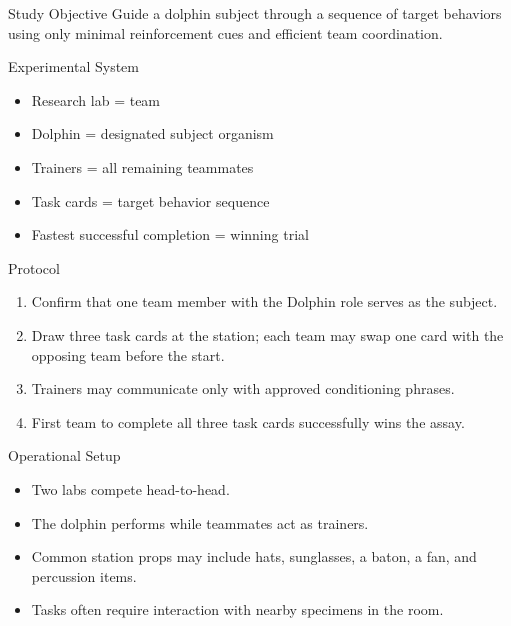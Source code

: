 \documentclass[10pt]{article}
\begin{document}
\begin{minipage}[t]{0.485\textwidth}
\vspace{0pt}
\begin{labbox}{Study Objective}
Guide a dolphin subject through a sequence of target behaviors using only minimal reinforcement cues and efficient team coordination.
\end{labbox}

\begin{labbox}{Experimental System}
\begin{itemize}
\item Research lab = team
\item Dolphin = designated subject organism
\item Trainers = all remaining teammates
\item Task cards = target behavior sequence
\item Fastest successful completion = winning trial
\end{itemize}
\end{labbox}

\begin{labbox}{Protocol}
\begin{enumerate}
\item Confirm that one team member with the Dolphin role serves as the subject.
\item Draw three task cards at the station; each team may swap one card with the opposing team before the start.
\item Trainers may communicate only with approved conditioning phrases.
\item First team to complete all three task cards successfully wins the assay.
\end{enumerate}
\end{labbox}

\begin{labbox}{Operational Setup}
\begin{itemize}
\item Two labs compete head-to-head.
\item The dolphin performs while teammates act as trainers.
\item Common station props may include hats, sunglasses, a baton, a fan, and percussion items.
\item Tasks often require interaction with nearby specimens in the room.
\end{itemize}
\end{labbox}
\end{minipage}\hfill
\end{document}
